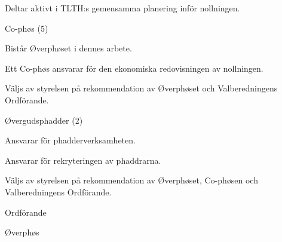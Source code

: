 \documentclass[../_main/handlingar.tex]{subfiles}
\begin{document}
\begin{attsatser}
\begin{emptylist}
\begin{dashlist}
                \item Deltar aktivt i TLTH:s gemensamma planering inför nollningen.
            \end{dashlist}
        \item Co-phøs (5)
            \begin{dashlist}
                \item Bistår Øverphøset i dennes arbete.
                \item Ett Co-phøs ansvarar för den ekonomiska redovisningen av nollningen.
                \item Väljs av styrelsen på rekommendation av Øverphøset och Valberedningens Ordförande.
            \end{dashlist}
        \item Øvergudsphadder (2)
            \begin{dashlist}
                \item Ansvarar för phadderverksamheten.
                \item Ansvarar för rekryteringen av phaddrarna.
                \item Väljs av styrelsen på rekommendation av Øverphøset, Co-phøsen och Valberedningens Ordförande.
            \end{dashlist}
    \end{emptylist}
\end{attsatser}

\begin{signatures}{2}
    \ist
    \signature{\ordf}{Ordförande}
    \signature{Niklas Gustafson}{Øverphøs}
\end{signatures}
\end{document}
